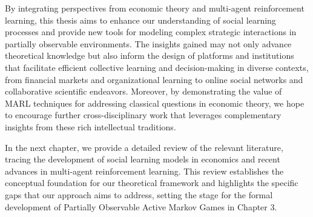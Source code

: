 By integrating perspectives from economic theory and multi-agent reinforcement learning, this thesis aims to enhance our understanding of social learning processes and provide new tools for modeling complex strategic interactions in partially observable environments. The insights gained may not only advance theoretical knowledge but also inform the design of platforms and institutions that facilitate efficient collective learning and decision-making in diverse contexts, from financial markets and organizational learning to online social networks and collaborative scientific endeavors. Moreover, by demonstrating the value of MARL techniques for addressing classical questions in economic theory, we hope to encourage further cross-disciplinary work that leverages complementary insights from these rich intellectual traditions.

In the next chapter, we provide a detailed review of the relevant literature, tracing the development of social learning models in economics and recent advances in multi-agent reinforcement learning. This review establishes the conceptual foundation for our theoretical framework and highlights the specific gaps that our approach aims to address, setting the stage for the formal development of Partially Observable Active Markov Games in Chapter 3.